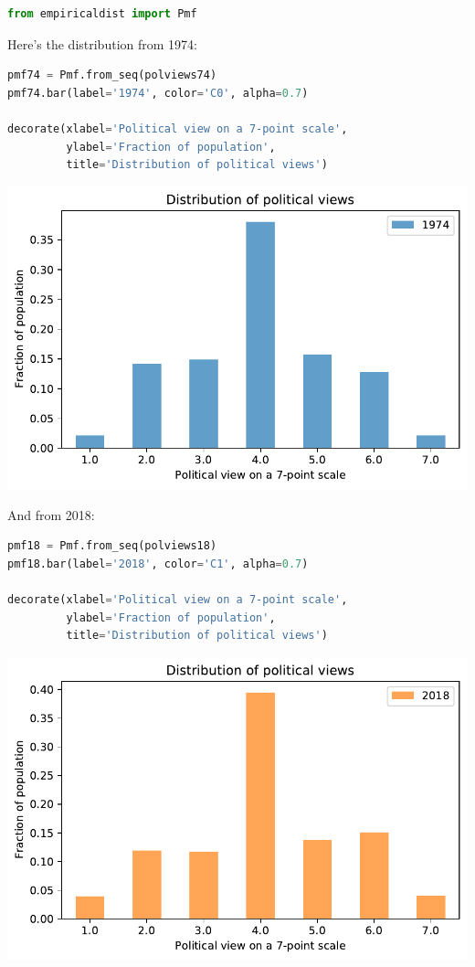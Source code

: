 \begin{lstlisting}[language=Python]
from empiricaldist import Pmf
\end{lstlisting}

Here's the distribution from 1974:

\begin{lstlisting}[language=Python]
pmf74 = Pmf.from_seq(polviews74)
pmf74.bar(label='1974', color='C0', alpha=0.7)

decorate(xlabel='Political view on a 7-point scale',
         ylabel='Fraction of population',
         title='Distribution of political views')
\end{lstlisting}

\begin{center}
\includegraphics[scale=0.75]{chapters/02_polviews_soln_files/02_polviews_soln_32_0.pdf}
\end{center}

And from 2018:

\begin{lstlisting}[language=Python]
pmf18 = Pmf.from_seq(polviews18)
pmf18.bar(label='2018', color='C1', alpha=0.7)

decorate(xlabel='Political view on a 7-point scale',
         ylabel='Fraction of population',
         title='Distribution of political views')
\end{lstlisting}

\begin{center}
\includegraphics[scale=0.75]{chapters/02_polviews_soln_files/02_polviews_soln_34_0.pdf}
\end{center}

